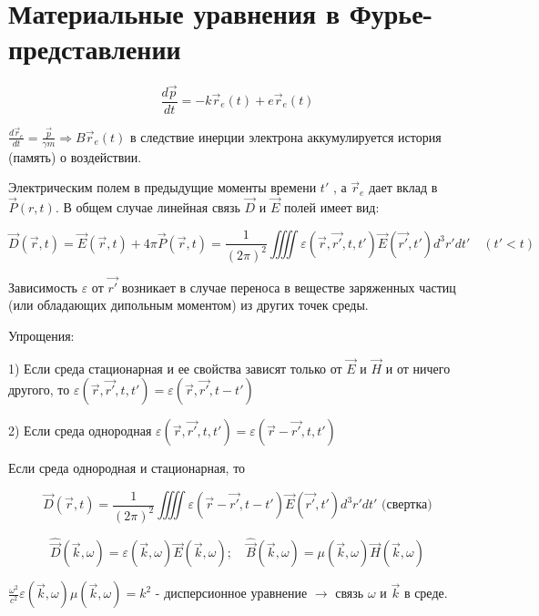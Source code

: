 \documentclass[12pt, a4paper]{report}
\begin{document}
\fi



\section{Материальные уравнения в Фурье-представлении}

\[ \frac{d \vec{p } }{dt } = - k \vec{r }_e (t )+ e \vec{r }_e (t )  \] 

\( \frac{d \vec{ r } _e }{dt }= \frac{\vec{ p } }{\gamma m }   \Rightarrow B \vec{r } _e (t ) \)   в следствие инерции электрона аккумулируется история (память) о воздействии.

Электрическим полем в предыдущие моменты времени \( t' \)  ,  а \( \vec{r } _e        \) дает вклад в \( \vec{P } (r,t) \). В общем случае линейная связь \( \vec{D }     \)  и \( \vec{E}  \)  полей имеет вид: 

\[ \vec{D } (\vec{r } ,t )= \vec{E } (\vec{r } , t )+ 4 \pi \vec{P } (\vec{r } , t ) = \frac{1}{(2 \pi ) ^2 } \iiiint \varepsilon(\vec{r } , \vec{r '} , t ,t ' ) \vec{E } (\vec{ r' } ,t' ) d ^3 r ' dt ' \quad ( t '< t ) \] 

Зависимость \( \varepsilon  \)  от \( \vec{r ' }  \)  возникает в случае переноса в веществе заряженных частиц (или обладающих дипольным моментом) из других точек среды.

Упрощения: 

1) Если среда стационарная и ее свойства зависят только от \( \vec{E }       \)  и \( \vec{ H}  \) и от ничего другого, то \( \varepsilon ( \vec{r } ,\vec{r '} , t,t ' ) =\varepsilon ( \vec{r } ,\vec{r ' } ,t -t ')  \) 

2) Если среда однородная \( \varepsilon ( \vec{r } ,\vec{r ' } ,t ,t' ) =\varepsilon ( \vec{r } - \vec{r' } , t ,t') \) 

Если среда однородная и стационарная, то 

\[ \vec{D } ( \vec{r } ,t )= \frac{1}{(2 \pi ) ^2 } \iiiint \varepsilon ( \vec{r }- \vec{r '} , t - t' ) \vec{E }  ( \vec{r' } ,t ') d ^3 r ' d t' \text{ (свертка)}    \] 

\[ \hat{\vec{D } }(\vec{k } ,\omega )=  \varepsilon( \vec{k } , \omega ) \vec{E }  ( \vec{k}, \omega ); \quad \hat{\vec{B} } ( \vec{k } , \omega ) = \mu ( \vec{k } , \omega) \vec{H } (\vec{k }  , \omega) \] 


\( \displaystyle \frac{\omega ^2 }{c ^2 }\varepsilon (\vec{k } , \omega )\mu( \vec{k } , \omega)= k ^2 \)    - дисперсионное уравнение \( \to       \)   связь \( \omega   \) и \( \vec{k }  \) в среде.
\end{document}
